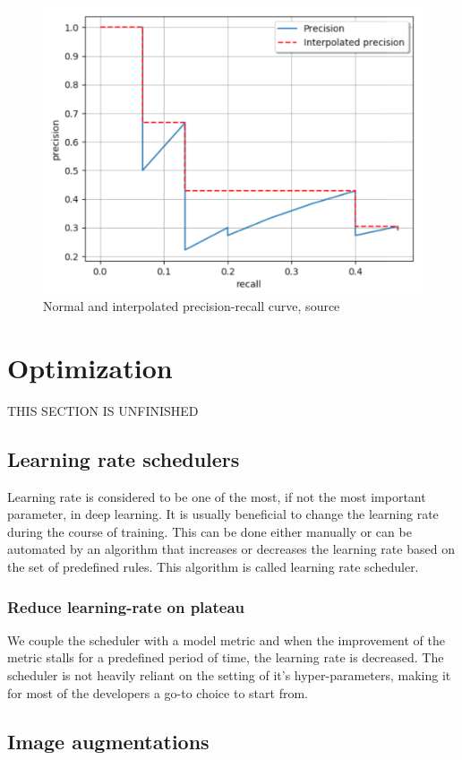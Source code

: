 \begin{figure}
    \includegraphics[width = \linewidth]{images/PR-curve.png}
    \caption{Normal and interpolated precision-recall curve, source \cite{Padilla2020}}
    \label{fig:pr_curve}
\end{figure}



\section{Optimization}
THIS SECTION IS UNFINISHED
\subsection{Learning rate schedulers}
Learning rate is considered to be one of the most, if not the most important parameter, in deep learning. It is usually beneficial to change the learning rate during the course of training. This can be done either manually or can be automated by an algorithm that increases or decreases the learning rate based on the set of predefined rules. This algorithm is called learning rate scheduler.

\subsubsection{Reduce learning-rate on plateau}
We couple the scheduler with a model metric and when the improvement of the metric stalls for a predefined period of time, the learning rate is decreased.
The scheduler is not heavily reliant on the setting of it's hyper-parameters, making it for most of the developers a go-to choice to start from.

\subsection{Image augmentations}



